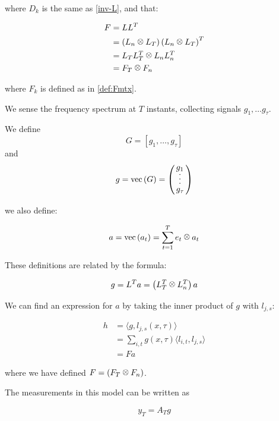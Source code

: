 \documentclass{article}
\begin{document}
where \(D_k\) is the same as \eqref{inv-L}, and that:

\begin{align}
F &= LL^T \\
&= \left(L_n \kronecker L_T\right)\left(L_n \kronecker L_T\right)^T\\
&=L_TL_T^T \kronecker L_nL_n^T \\
&= F_T \kronecker F_n
\end{align}

where \(F_k\) is defined as in \eqref{def:Fmtx}.

We sense the frequency spectrum at \(T\) instants, collecting signals \(g_1, \ldots g_\tau\). 

\begin{definition}
We define
\begin{equation}
G = \left[g_1, \ldots, g_\tau \right]
\end{equation}
and
\begin{equation}
g = \mathrm{vec}\left(G\right) = \dottedcolumn{3}{g_1}{g_\tau}
\end{equation}
\end{definition}

we also define:

\begin{definition}
\begin{equation}
a = \mathrm{vec}\left(a_t\right) = \sum_{t=1}^T e_t \kronecker a_t
\end{equation}
\end{definition}

These definitions are related by the formula:

\begin{equation}
g = L^Ta = \left(L_T^T \kronecker L_n^T\right)a
\end{equation}

We can find an expression for \(a\) by taking the inner product of \(g\) with \(l_{j,s}\):

\begin{align*}
h &= \langle g, l_{j,s}\left(x, \tau\right)\rangle \\
&= \sum_{i,t} g(x,\tau) \langle l_{i,t}, l_{j,s} \rangle \\
&= Fa
\end{align*}

where we have defined \(F = \left(F_T \kronecker F_n\right)\).

The measurements in this model can be written as

\begin{equation}
y_T = A_Tg
\end{equation}
\end{document}
